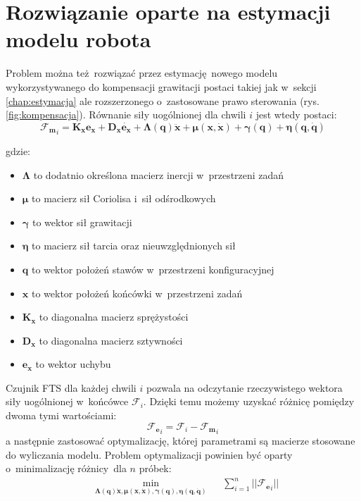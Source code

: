 \section{Rozwiązanie oparte na estymacji modelu robota}
\label{chap:rozw_model}
Problem można też rozwiązać przez estymację nowego modelu wykorzystywanego do kompensacji grawitacji postaci takiej jak w~sekcji \ref{chap:estymacja} ale rozszerzonego o~zastosowane prawo sterowania \cite{bib:rozw_opt1, bib:rozw_opt2} (rys. \ref{fig:kompensacja}). Równanie siły uogólnionej dla chwili $i$ jest wtedy postaci:
\begin{equation}
\boldsymbol{\mathcal{F}_{m}}_i = \boldsymbol{K_x}\boldsymbol{e_x} + \boldsymbol{D_x}\dot{\boldsymbol{e_x}} + \boldsymbol{\Lambda}(\boldsymbol{q})\boldsymbol{\ddot{x}} + \boldsymbol{\mu}(\boldsymbol{x}, \boldsymbol{\dot{x}}) + \boldsymbol{\gamma}(\boldsymbol{q}) + \boldsymbol{\eta}(\boldsymbol{q}, \boldsymbol{\dot{q}})
\end{equation}

gdzie: 

\begin{itemize}
	\item $\boldsymbol{\Lambda}$ to dodatnio określona macierz inercji w~przestrzeni zadań
	\item $\boldsymbol{\mu}$ to macierz sił Coriolisa i~sił odśrodkowych	
	\item $\boldsymbol{\gamma}$ to wektor sił grawitacji
	\item $\boldsymbol{\eta}$ to macierz sił tarcia oraz nieuwzględnionych sił
	\item $\boldsymbol{q}$ to wektor położeń stawów w~przestrzeni konfiguracyjnej
	\item $\boldsymbol{x}$ to wektor położeń końcówki w~przestrzeni zadań
	\item $\boldsymbol{K_x}$ to diagonalna macierz sprężystości
	\item $\boldsymbol{D_x}$ to diagonalna macierz sztywności
	\item $\boldsymbol{e_x}$ to wektor uchybu
\end{itemize} 


Czujnik FTS dla każdej chwili $i$ pozwala na odczytanie rzeczywistego wektora siły uogólnionej w~końcówce $\boldsymbol{\mathcal{F}}_i$. Dzięki temu możemy uzyskać różnicę pomiędzy dwoma tymi wartościami:
\begin{equation}
\boldsymbol{\mathcal{F}_{e}}_i = \boldsymbol{\mathcal{F}}_{i} - \boldsymbol{\mathcal{F}_{m}}_i
\end{equation}
a następnie zastosować optymalizację, której parametrami są macierze stosowane do wyliczania modelu. Problem optymalizacji powinien być oparty o~minimalizację różnicy dla $n$ próbek:
\begin{equation}
\begin{aligned}
& \underset{\boldsymbol{\Lambda}(\boldsymbol{q})\boldsymbol{\ddot{x}}, \boldsymbol{\mu}(\boldsymbol{x}, \boldsymbol{\dot{x}}), \boldsymbol{\gamma}(\boldsymbol{q}), \boldsymbol{\eta}(\boldsymbol{q}, \boldsymbol{\dot{q}})}{\text{min}}
& & \sum_{i = 1}^{n} || \boldsymbol{\mathcal{F}_{e}}_i ||
\end{aligned}
\end{equation}

